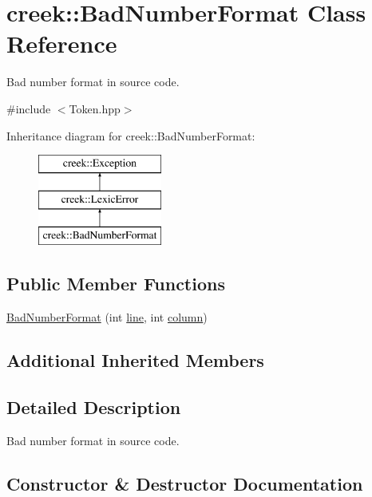 \hypertarget{classcreek_1_1_bad_number_format}{}\section{creek\+:\+:Bad\+Number\+Format Class Reference}
\label{classcreek_1_1_bad_number_format}


Bad number format in source code.  




{\ttfamily \#include $<$Token.\+hpp$>$}

Inheritance diagram for creek\+:\+:Bad\+Number\+Format\+:\begin{figure}[H]
\begin{center}
\leavevmode
\includegraphics[height=3.000000cm]{classcreek_1_1_bad_number_format}
\end{center}
\end{figure}
\subsection*{Public Member Functions}
\begin{DoxyCompactItemize}
\item 
\hyperlink{classcreek_1_1_bad_number_format_a8493047d7821d8ff645c7f7b467840a0}{Bad\+Number\+Format} (int \hyperlink{classcreek_1_1_lexic_error_a80a01ab094f2e89db9258fb111b0749d}{line}, int \hyperlink{classcreek_1_1_lexic_error_ab03a66cccc9bd40b074371fdbbf64398}{column})
\end{DoxyCompactItemize}
\subsection*{Additional Inherited Members}


\subsection{Detailed Description}
Bad number format in source code. 

\subsection{Constructor \& Destructor Documentation}
